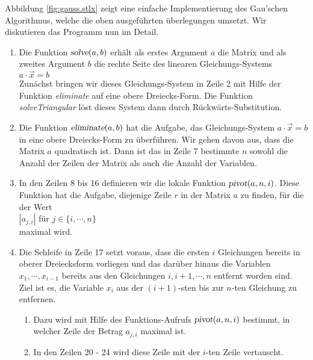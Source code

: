 \noindent
Abbildung \ref{fig:gauss.stlx} zeigt eine einfache Implementierung des Gau\3'schen Algorithmus, welche die
oben ausgef\"{u}hrten \"{u}berlegungen umsetzt.  Wir diskutieren das Programm nun im Detail.
\begin{enumerate}
\item Die Funktion $\textsl{solve}(a, b)$ erh\"{a}lt als erstes Argument $a$ die Matrix und
      als zweites Argument $b$ die rechte Seite des linearen Gleichungs-Systems
      \\[0.2cm]
      \hspace*{1.3cm}
      $a \cdot \vec{x} = b$
      \\[0.2cm]
      Zun\"{a}chst bringen wir dieses Gleichungs-System in Zeile 2 mit Hilfe der Funktion \textsl{eliminate} auf
      eine obere Dreiecks-Form.  Die Funktion \textsl{solveTriangular} l\"{o}st dieses System dann durch
      R\"{u}ckw\"{a}rts-Substitution.
\item Die Funktion $\textsl{eliminate}(a, b)$ hat die Aufgabe, das Gleichungs-System $a \cdot \vec{x} = b$
      in eine obere Dreiecks-Form zu \"{u}berf\"{u}hren.  Wir gehen davon aus, dass die Matrix $a$ quadratisch ist. 
      Dann ist das in Zeile 7 bestimmte $n$ sowohl die Anzahl der Zeilen der Matrix als auch die Anzahl
      der Variablen.
\item In den Zeilen 8 bis 16 definieren wir die lokale Funktion $\textsl{pivot}(a, n, i)$.  Diese Funktion 
      hat die Aufgabe, diejenige Zeile $r$ in der Matrix $a$ zu finden, f\"{u}r die der Wert
      \\[0.2cm]
      \hspace*{1.3cm}
      $|a_{j,i}|$ \quad f\"{u}r $j \in \{i, \cdots, n \}$
      \\[0.2cm]
      maximal wird.
\item Die Schleife in Zeile 17 setzt voraus, dass die ersten $i$ Gleichungen bereits in oberer 
      Dreiecksform vorliegen und das dar\"{u}ber hinaus die Variablen $x_1, \cdots, x_{i-1}$
      bereits aus den Gleichungen $i, i+1, \cdots, n$  entfernt worden sind.
      Ziel ist es,  die Variable $x_i$ aus der $(i+1)$-sten bis zur $n$-ten
      Gleichung zu entfernen.  
      \begin{enumerate}
      \item Dazu wird  mit Hilfe des Funktions-Aufrufs $\textsl{pivot}(a,n,i)$
            bestimmt, in welcher Zeile der Betrag $a_{j,i}$ maximal ist.
      \item In den Zeilen 20 - 24 wird diese Zeile  mit der $i$-ten Zeile vertauscht.

\end{enumerate}
\end{enumerate}
